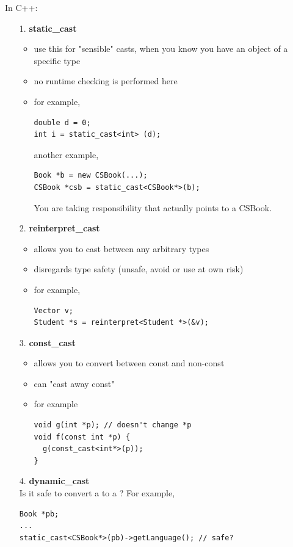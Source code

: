 \documentclass[english, 11pt]{article}
\begin{document}
In C++:
\begin{itemize}
  \item[1.] \textbf{static\_cast}
  \begin{itemize}
    \item use this for "sensible" casts, when you know you have an object of a specific type
    \item no runtime checking is performed here
    \item for example,
    \begin{lstlisting}
double d = 0;
int i = static_cast<int> (d);
    \end{lstlisting}
    another example,
    \begin{lstlisting}
Book *b = new CSBook(...);
CSBook *csb = static_cast<CSBook*>(b);
    \end{lstlisting}
    You are taking responsibility that  actually points to a CSBook.
  \end{itemize}
  \item[2.] \textbf{reinterpret\_cast}
  \begin{itemize}
    \item allows you to cast between any arbitrary types
    \item disregards type safety (unsafe, avoid or use at own risk)
    \item for example,
    \begin{lstlisting}
Vector v;
Student *s = reinterpret<Student *>(&v);
    \end{lstlisting}
  \end{itemize}
  \item[3.] \textbf{const\_cast}
  \begin{itemize}
    \item allows you to convert between const and non-const
    \item can "cast away const"
    \item for example
    \begin{lstlisting}
void g(int *p); // doesn't change *p
void f(const int *p) {
  g(const_cast<int*>(p));
}
    \end{lstlisting}
  \end{itemize}
  \item[4.] \textbf{dynamic\_cast} \\
  Is it safe to convert a  to a ? For example,
  \begin{lstlisting}
Book *pb;
...
static_cast<CSBook*>(pb)->getLanguage(); // safe?
  \end{lstlisting}

\end{itemize}
\end{document}

